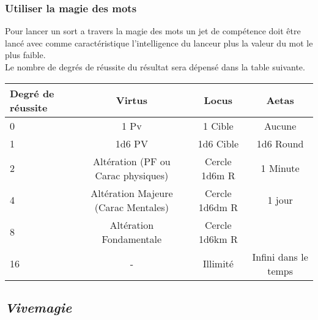 \subsubsection{Utiliser la magie des mots}
Pour lancer un sort a travers la magie des mots un jet de compétence doit être lancé avec comme caractéristique 
l’intelligence du lanceur plus la valeur du mot le plus faible.\\
Le nombre de degrés de réussite du résultat sera dépensé dans la table suivante.
\begin{center}
\begin{tabular}{|l| |c|c|c|}
    \hline
    Degré de réussite &     Virtus & Locus & Aetas\\
    \hline
    \hline
    0                 & 1 Pv       & 1 Cible & Aucune \\
    1                 & 1d6 PV     & 1d6 Cible & 1d6 Round \\
    2   & Altération (PF ou Carac physiques) & Cercle 1d6m R &   1 Minute\\
    4   & Altération Majeure (Carac Mentales)& Cercle 1d6dm R &   1 jour\\
    8   & Altération Fondamentale  &   Cercle 1d6km R & \\  
    16                &  -         & Illimité&  Infini dans le temps\\
    \hline
\end{tabular}
\end{center}

\subsection{\em Vivemagie}

